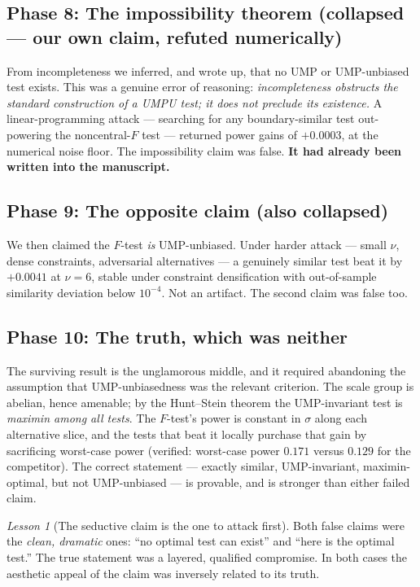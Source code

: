 \documentclass[11pt]{article}
\theoremstyle{remark}
\newtheorem{lesson}{Lesson}
\begin{document}
\subsection{Phase 8: The impossibility theorem (collapsed --- our own claim, refuted numerically)}
From incompleteness we inferred, and wrote up, that no UMP or UMP-unbiased test exists. This was a genuine error of reasoning: \emph{incompleteness obstructs the standard construction of a UMPU test; it does not preclude its existence.} A linear-programming attack --- searching for any boundary-similar test out-powering the noncentral-$F$ test --- returned power gains of $+0.0003$, at the numerical noise floor. The impossibility claim was false. \textbf{It had already been written into the manuscript.}

\subsection{Phase 9: The opposite claim (also collapsed)}
We then claimed the $F$-test \emph{is} UMP-unbiased. Under harder attack --- small $\nu$, dense constraints, adversarial alternatives --- a genuinely similar test beat it by $+0.0041$ at $\nu=6$, stable under constraint densification with out-of-sample similarity deviation below $10^{-4}$. Not an artifact. The second claim was false too.

\subsection{Phase 10: The truth, which was neither}
The surviving result is the unglamorous middle, and it required abandoning the assumption that UMP-unbiasedness was the relevant criterion. The scale group is abelian, hence amenable; by the Hunt--Stein theorem \citep{lehmann2005} the UMP-invariant test is \emph{maximin among all tests}. The $F$-test's power is constant in $\sigma$ along each alternative slice, and the tests that beat it locally purchase that gain by sacrificing worst-case power (verified: worst-case power $0.171$ versus $0.129$ for the competitor). The correct statement --- exactly similar, UMP-invariant, maximin-optimal, but not UMP-unbiased --- is provable, and is stronger than either failed claim.

\begin{lesson}[The seductive claim is the one to attack first]
Both false claims were the \emph{clean, dramatic} ones: ``no optimal test can exist'' and ``here is the optimal test.'' The true statement was a layered, qualified compromise. In both cases the aesthetic appeal of the claim was inversely related to its truth.
\end{lesson}
\end{document}
